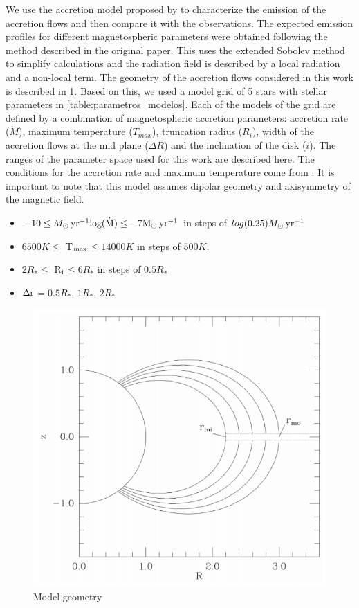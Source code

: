 \documentclass[twocolumn,linenumbers]{aastex631}
\newcommand{\Mdot}{{\dot{{M}}}}
\newcommand{\msunyr}{M_{\sun} \, \rm{ yr^{-1}}}
\newcommand{\ri}{R$_{\rm i}$}
\newcommand{\Dr}{$\Delta \rm r$}
\newcommand{\tmax}{T$_{\rm max}$}
\begin{document}
We use the accretion model proposed by \citet{muzerolle2001} to characterize the emission of the accretion flows and then compare it with the observations. The expected emission profiles for different magnetospheric parameters were obtained following the method described in the original paper. This uses the extended Sobolev method to simplify calculations and the radiation field is described by a local radiation and a non-local term. The geometry of the accretion flows considered in this work is described in \ref{fig:model_geometry}. Based on this, we used a model grid of 5 stars with stellar parameters in \ref{table:parametros_modelos}. Each of the models of the grid are defined by a combination of magnetospheric accretion parameters: accretion rate ($\dot{M}$), maximum temperature ($T_{max}$), truncation radius ($R_i$), width of the accretion flows at the mid plane ($\Delta R$) and the inclination of the disk ($i$).  The ranges of the parameter space used for this work are described here. The conditions for the accretion rate and maximum temperature come from \citet{muzerolle2001}.  It is important to note that this model assumes dipolar geometry and axisymmetry of the magnetic field. 

\begin{itemize}
    \item $-10 \leq \msunyr log(\Mdot) \leq -7\msunyr$ in steps of $log(0.25) \msunyr$
    \item $6500 K \leq$ \tmax $\leq 14000 K$ in steps of $500 K$.
    \item $2 R_* \leq$ \ri $\leq 6 R_*$ in steps of $0.5 R_*$
    \item \Dr $= 0.5 R_*$, $1 R_*$, $2 R_*$
\end{itemize}

\begin{figure}
    \centering
    \includegraphics[width=0.75\linewidth]{figures/geometry.png}
    \caption{Model geometry}
    \label{fig:model_geometry}
\end{figure}
\end{document}
